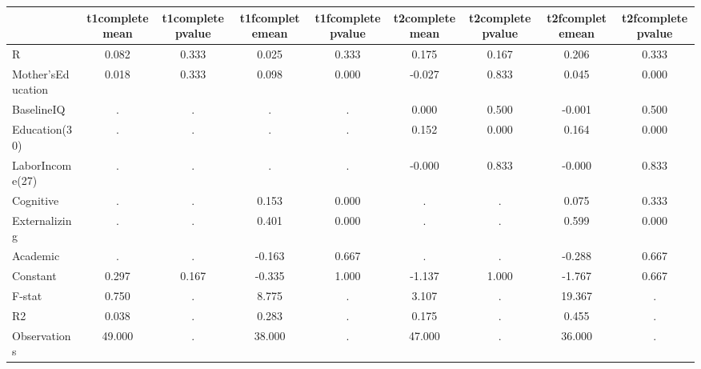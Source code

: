 \begin{table}[htbp]
\begin{tabular}{lcccccccc} \hline \hline
 & t1completemean  & t1completepvalue  & t1fcompletemean  & t1fcompletepvalue  & t2completemean  & t2completepvalue  & t2fcompletemean  & t2fcompletepvalue  \\  \hline 
R &     0.082 &     0.333 &     0.025 &     0.333 &     0.175 &     0.167 &     0.206 &     0.333 \\  
Mother'sEducation &     0.018 &     0.333 &     0.098 &     0.000 &    -0.027 &     0.833 &     0.045 &     0.000 \\  
BaselineIQ &         . &         . &         . &         . &     0.000 &     0.500 &    -0.001 &     0.500 \\  
Education(30) &         . &         . &         . &         . &     0.152 &     0.000 &     0.164 &     0.000 \\  
LaborIncome(27) &         . &         . &         . &         . &    -0.000 &     0.833 &    -0.000 &     0.833 \\  
Cognitive &         . &         . &     0.153 &     0.000 &         . &         . &     0.075 &     0.333 \\  
Externalizing &         . &         . &     0.401 &     0.000 &         . &         . &     0.599 &     0.000 \\  
Academic &         . &         . &    -0.163 &     0.667 &         . &         . &    -0.288 &     0.667 \\  
Constant &     0.297 &     0.167 &    -0.335 &     1.000 &    -1.137 &     1.000 &    -1.767 &     0.667 \\  
F-stat &     0.750 &         . &     8.775 &         . &     3.107 &         . &    19.367 &         . \\  
R2 &     0.038 &         . &     0.283 &         . &     0.175 &         . &     0.455 &         . \\  
Observations &    49.000 &         . &    38.000 &         . &    47.000 &         . &    36.000 &         . \\  
\hline \hline \end{tabular}
\end{table}
